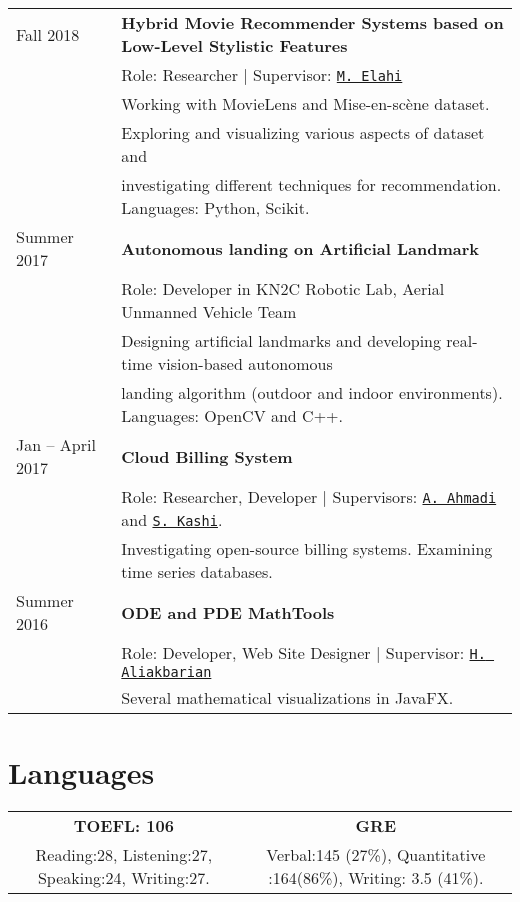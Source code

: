 \documentclass[letterpaper]{article}
\begin{document}
{{\renewcommand{\arraystretch}{1.2}
\begin{tabular}{l l}
Fall 2018  & \textbf{Hybrid Movie Recommender Systems based on Low-Level Stylistic Features} \\ & Role: Researcher | Supervisor: \href{https://scholar.google.com/citations?user=aUWF7LYAAAAJ&hl=en}{\tt M. Elahi} \\&Working with MovieLens  and Mise-en-scène dataset. \\&Exploring and visualizing various aspects of dataset and\\& investigating different techniques for recommendation. Languages: Python, Scikit.
\\
Summer 2017 & \textbf{Autonomous landing on Artificial Landmark} \\ & Role: Developer in KN2C Robotic Lab, Aerial Unmanned Vehicle Team \\&Designing artificial landmarks and developing real-time vision-based autonomous \\& landing algorithm (outdoor and indoor environments). Languages: OpenCV and C++.
\\
Jan – April 2017 & \textbf{Cloud Billing System} \\& Role: Researcher, Developer | Supervisors: \href{http://wp.kntu.ac.ir/ahmadi/}{\tt A. Ahmadi} and \href{http://wp.kntu.ac.ir/sedighian/}{\tt  S. Kashi}.
\\&
Investigating open-source billing systems. Examining time series databases.
\\
Summer 2016 &  \textbf{ODE and PDE MathTools} \\&
Role: Developer, Web Site Designer | Supervisor: \href{http://wp.kntu.ac.ir/aliakbarian/}{\tt H. Aliakbarian} \\&
Several mathematical visualizations in JavaFX.

\end{tabular}

\section*{Languages}


\begin{tabular}{|c|c|}
\textbf{TOEFL: 106} & \textbf{GRE} \\
Reading:28, Listening:27, Speaking:24, Writing:27. & Verbal:145 (27\%), Quantitative :164(86\%), Writing: 3.5 (41\%).\\
\end{tabular}



}}
\end{document}
